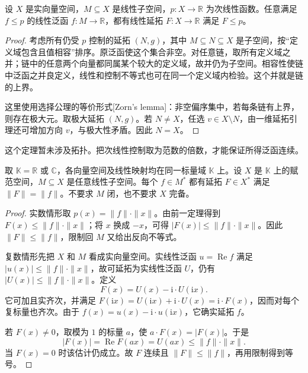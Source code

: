\begin{theorem}\label{b1:thm:hahn-banach-sublinear}
设 \(X\) 是实向量空间，\(M\subseteq X\) 是线性子空间，\(p:X\to\mathbb R\) 为次线性函数。任意满足 \(f\leq p\) 的线性泛函 \(f:M\rightarrow\mathbb R\)，都有线性延拓 \(F:X\rightarrow\mathbb R\) 满足 \(F\leq p\)。
\end{theorem}
\begin{proof}
考虑所有仍受 \(p\) 控制的延拓 \((N,g)\)，其中 \(M\subseteq N\subseteq X\) 是子空间，按“定义域包含且值相容”排序。原泛函使这个集合非空。对任意链，取所有定义域之并；链中的任意两个向量都同属某个较大的定义域，故并仍为子空间。相容性使链中泛函之并良定义，线性和控制不等式也可在同一个定义域内检验。这个并就是链的上界。

这里使用选择公理的等价形式[Zorn's lemma]：非空偏序集中，若每条链有上界，则存在极大元。取极大延拓 \((N,g)\)。若 \(N\ne X\)，任选 \(v\in X\setminus N\)，由一维延拓引理还可增加方向 \(v\)，与极大性矛盾。因此 \(N=X\)。
\end{proof}

这个定理暂未涉及拓扑。把次线性控制取为范数的倍数，才能保证所得泛函连续。

\begin{theorem}\label{b1:thm:hahn-banach}
取 \(\mathbb K=\mathbb R\) 或 \(\mathbb C\)，各向量空间及线性映射均在同一标量域 \(\mathbb K\) 上。设 \(X\) 是 \(\mathbb K\) 上的赋范空间，\(M\subseteq X\) 是任意线性子空间。每个 \(f\in M^*\) 都有延拓 \(F\in X^*\) 满足 \(\|F\|=\|f\|\)。不要求 \(M\) 闭，也不要求 \(X\) 完备。
\end{theorem}
\begin{proof}
实数情形取 \(p(x)=\|f\|\cdot\|x\|\)。由前一定理得到 \(F(x)\leq\|f\|\cdot\|x\|\)；将 \(x\) 换成 \(-x\)，可得 \(|F(x)|\leq\|f\|\cdot\|x\|\)。因此 \(\|F\|\leq\|f\|\)，限制回 \(M\) 又给出反向不等式。

复数情形先把 \(X\) 和 \(M\) 看成实向量空间。实线性泛函 \(u=\operatorname{Re}f\) 满足 \(|u(x)|\leq\|f\|\cdot\|x\|\)，故可延拓为实线性泛函 \(U\)，仍有 \(|U(x)|\leq\|f\|\cdot\|x\|\)。定义
\[
F(x)=U(x)-\mathrm i\cdot U(\mathrm ix).
\]
它可加且实齐次，并满足
\(F(\mathrm ix)=U(\mathrm ix)+\mathrm i\cdot U(x)=\mathrm i\cdot F(x)\)，因而对每个复标量也齐次。由于 \(f(x)=u(x)-\mathrm i\cdot u(\mathrm ix)\)，它确实延拓 \(f\)。

若 \(F(x)\ne0\)，取模为 \(1\) 的标量 \(a\)，使 \(a\cdot F(x)=|F(x)|\)。于是
\[
|F(x)|=\operatorname{Re}F(ax)=U(ax)\leq\|f\|\cdot\|x\|.
\]
当 \(F(x)=0\) 时该估计仍成立。故 \(F\) 连续且 \(\|F\|\leq\|f\|\)，再用限制得到等号。
\end{proof}

